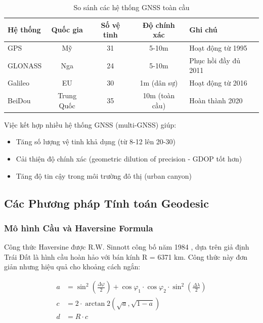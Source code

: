 \begin{table}[H]
\centering
\begin{tabular}{|l|c|c|c|p{4cm}|}
\hline
\textbf{Hệ thống} & \textbf{Quốc gia} & \textbf{Số vệ tinh} & \textbf{Độ chính xác} & \textbf{Ghi chú} \\
\hline
GPS & Mỹ & 31 & 5-10m & Hoạt động từ 1995 \\
\hline
GLONASS & Nga & 24 & 5-10m & Phục hồi đầy đủ 2011 \\
\hline
Galileo & EU & 30 & 1m (dân sự) & Hoạt động từ 2016 \\
\hline
BeiDou & Trung Quốc & 35 & 10m (toàn cầu) & Hoàn thành 2020 \\
\hline
\end{tabular}
\caption{So sánh các hệ thống GNSS toàn cầu \cite{groves2013principles}}
\end{table}

Việc kết hợp nhiều hệ thống GNSS (multi-GNSS) giúp:
\begin{itemize}
    \item Tăng số lượng vệ tinh khả dụng (từ 8-12 lên 20-30)
    \item Cải thiện độ chính xác (geometric dilution of precision - GDOP tốt hơn)
    \item Tăng độ tin cậy trong môi trường đô thị (urban canyon)
\end{itemize}

\subsection{Các Phương pháp Tính toán Geodesic}

\subsubsection{Mô hình Cầu và Haversine Formula}
Công thức Haversine được R.W. Sinnott công bố năm 1984 \cite{sinnot1984virtues}, dựa trên giả định Trái Đất là hình cầu hoàn hảo với bán kính R = 6371 km. Công thức này đơn giản nhưng hiệu quả cho khoảng cách ngắn:

\begin{equation}
\begin{aligned}
a &= \sin^2\left(\frac{\Delta\varphi}{2}\right) + \cos\varphi_1 \cdot \cos\varphi_2 \cdot \sin^2\left(\frac{\Delta\lambda}{2}\right) \\
c &= 2 \cdot \arctan2\left(\sqrt{a}, \sqrt{1-a}\right) \\
d &= R \cdot c
\end{aligned}
\end{equation}

